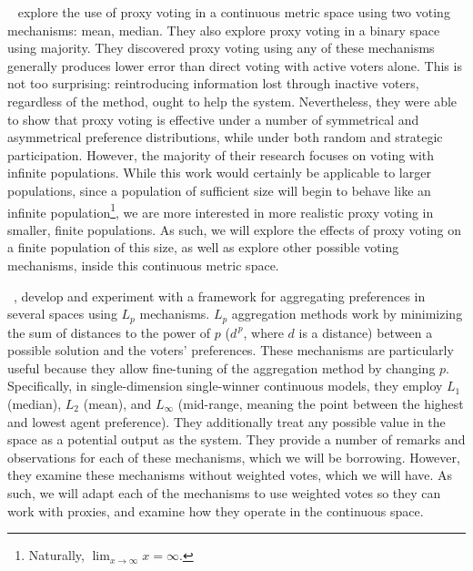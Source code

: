 ~\cite{Cohensius2017} explore the use of proxy voting in a
continuous metric space using two voting mechanisms: mean, median.
They also explore proxy voting in a binary space using majority.
They discovered proxy voting using any of these mechanisms generally produces lower
error than direct voting with active voters alone.
This is not too surprising: reintroducing information lost through inactive voters,
regardless of the method, ought to help the system.
Nevertheless, they were able to show that proxy voting is effective under a number of
symmetrical and asymmetrical preference distributions, while under both random and
strategic participation.
However, the majority of their research focuses on voting with infinite populations.
While this work would certainly be applicable to larger populations, since a
population of sufficient size will begin to behave like an infinite
population\footnote{
    Naturally, $\lim_{x \rightarrow \infty} x = \infty$.
}, we are more interested in more realistic proxy voting in smaller, finite populations.
As such, we will explore the effects of proxy voting on a finite population of this
size, as well as explore other possible voting mechanisms, inside this continuous
metric space.

~\cite{Bulteau2021}, develop and experiment with a framework for
aggregating preferences in several spaces using $L_p$ mechanisms.
$L_p$ aggregation methods work by minimizing the sum of distances to the power of $p$
($d^{\,p}$, where $d$ is a distance) between a possible solution and the voters'
preferences.
These mechanisms are particularly useful because they allow fine-tuning of the
aggregation method by changing $p$.
Specifically, in single-dimension single-winner continuous models, they employ $L_1$
(median),
$L_2$ (mean), and $L_{\infty}$ (mid-range, meaning the point between the highest and
lowest agent preference).
They additionally treat any possible value in the space as a potential output as the
system.
They provide a number of remarks and observations for each of these mechanisms, which
we will be borrowing.
However, they examine these mechanisms without weighted votes, which we will have.
As such, we will adapt each of the mechanisms to use weighted votes so they can work
with proxies, and examine how they operate in the continuous space.

